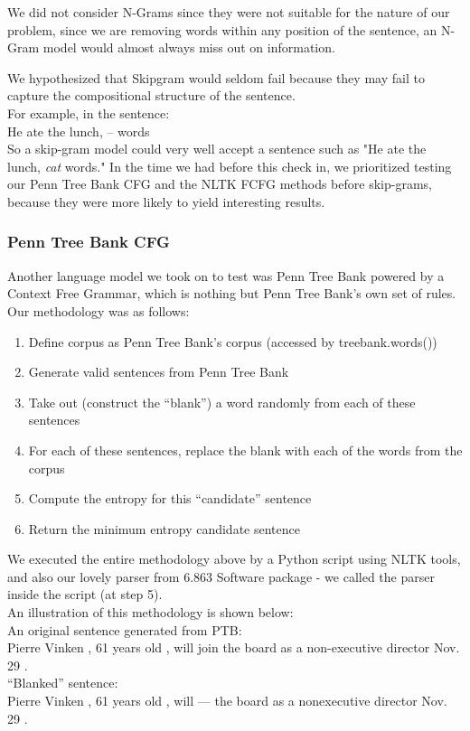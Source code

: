 \documentclass{article}[12pt]
\theoremstyle{definition}
\begin{document}
We did not consider N-Grams since they were not suitable for the nature of our problem, since we are removing words within any position of the sentence, an N-Gram model would almost always miss out on information.  

We hypothesized that Skipgram would seldom fail because they may fail to capture the compositional structure of the sentence. \\

For example, in the sentence: \\

He ate the lunch, -- words \\

So a skip-gram model could very well accept a sentence such as "He ate the lunch, \emph{cat} words." 
In the time we had before this check in, we prioritized testing our Penn Tree Bank CFG and the NLTK FCFG methods before skip-grams, because they were more likely to yield interesting results.

\subsubsection{Penn Tree Bank CFG}

Another language model we took on to test was Penn Tree Bank powered by a Context Free Grammar, which is nothing but Penn Tree Bank's own set of rules. Our methodology was as follows:

\begin{enumerate}
\item Define corpus as Penn Tree Bank’s corpus (accessed by treebank.words()) 
\item Generate valid sentences from Penn Tree Bank 
\item Take out (construct the “blank”) a word randomly from each of these sentences 
\item For each of these sentences, replace the blank with each of the words from the corpus
\item Compute the entropy for this “candidate” sentence
\item Return the minimum entropy candidate sentence
\end{enumerate}

We executed the entire methodology above by a Python script using NLTK tools, and also our lovely parser from 6.863 Software package - we called the parser inside the script (at step 5). \\ 

An illustration of this methodology is shown below: \\
An original sentence generated from PTB:\\
Pierre Vinken , 61 years old , will join the board as a non-executive director Nov. 29 .\\
“Blanked” sentence: \\
Pierre Vinken , 61 years old , will --- the board as a nonexecutive director Nov. 29 .\\
\end{document}
